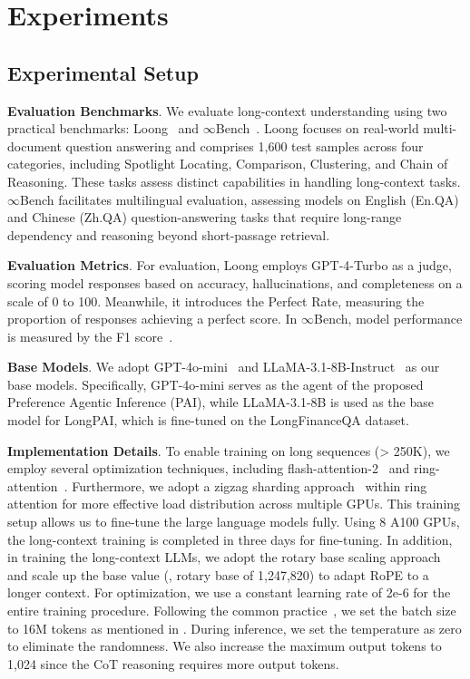 \section{Experiments}




\subsection{Experimental Setup}\label{sec:4.1}

\noindent \textbf{Evaluation Benchmarks}.
We evaluate long-context understanding using two practical benchmarks: Loong~\cite{wang2024leave} and $\infty$Bench~\cite{zhang2024bench}. Loong focuses on real-world multi-document question answering and comprises 1,600 test samples across four categories, including Spotlight Locating, Comparison, Clustering, and Chain of Reasoning. These tasks assess distinct capabilities in handling long-context tasks. $\infty$Bench facilitates multilingual evaluation, assessing models on English (En.QA) and Chinese (Zh.QA) question-answering tasks that require long-range dependency and reasoning beyond short-passage retrieval.

\noindent \textbf{Evaluation Metrics}. For evaluation, Loong employs GPT-4-Turbo as a judge, scoring model responses based on accuracy, hallucinations, and completeness on a scale of 0 to 100. Meanwhile, it introduces the Perfect Rate, measuring the proportion of responses achieving a perfect score. In $\infty$Bench, model performance is measured by the F1 score~\cite{zhang2024bench}. 

\noindent \textbf{Base Models}. 
We adopt GPT-4o-mini~\cite{achiam2023gpt} and LLaMA-3.1-8B-Instruct~\cite{dubey2024llama} as our base models. Specifically, GPT-4o-mini serves as the agent of the proposed Preference Agentic Inference (PAI), while LLaMA-3.1-8B is used as the base model for LongPAI, which is fine-tuned on the LongFinanceQA dataset.


\noindent \textbf{Implementation Details}.
To enable training on long sequences (> 250K), we employ several optimization techniques, including flash-attention-2~\cite{dao2023flashattention} and ring-attention~\cite{liu2024ringattention}. Furthermore, we adopt a zigzag sharding approach~\cite{zhu2024ringflash} within ring attention for more effective load distribution across multiple GPUs. This training setup allows us to fine-tune the large language models fully.
Using 8 A100 GPUs, the long-context training is completed in three days for fine-tuning.
In addition, in training the long-context LLMs, we adopt the rotary base scaling approach~\cite{liu2024scaling} and scale up the base value (\ie, rotary base of 1,247,820) to adapt RoPE to a longer context.
For optimization, we use a constant learning rate of 2e-6 for the entire training procedure.
Following the common practice~\cite{fu2024data}, we set the batch size to 16M tokens as mentioned in \cite{dubey2024llama}.
During inference, we set the temperature as zero to eliminate the randomness. We also increase the maximum output tokens to 1,024 since the CoT reasoning requires more output tokens.


